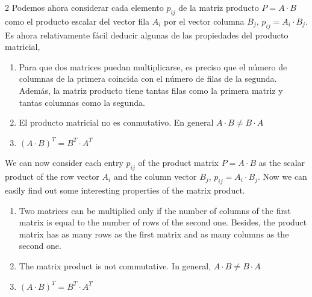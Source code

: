 \begin{paracol}{2}
Podemos ahora considerar  cada elemento $p_{ij}$ de la matriz producto $P=A\cdot B$ como el producto escalar del vector fila $A_i$ por el vector columna $B_j$, $p_{ij}=A_i\cdot B_j$. 
Es ahora relativamente fácil deducir algunas de las propiedades del producto matricial,

\begin{enumerate}
\item Para que dos matrices puedan multiplicarse, es preciso que el número de columnas de la primera coincida con el número de filas de la segunda. Además, la matriz producto tiene tantas filas como la primera matriz y tantas columnas como la segunda.

\item El producto matricial no es conmutativo. En general $A\cdot B \neq B \cdot A$

\item $(A\cdot B)^T=B^T\cdot A^T$
\end{enumerate}

\switchcolumn
We can now consider each entry $p_{ij}$ of the product matrix $P=A\cdot B$ as the scalar product of the row vector $A_i$ and the column vector $B_j$, $p_{ij} = A_i\cdot B_j$. Now we can easily find out some interesting properties of the matrix product.

\begin{enumerate}
\item Two matrices can be multiplied only if the number of columns of the first matrix is equal to the number of rows of the second one. Besides, the product matrix has as many rows as the first matrix and as many columns as the second one.

\item The matrix product is not commutative. In general, $A\cdot B \neq B \cdot A$

\item $(A\cdot B)^T=B^T\cdot A^T$
\end{enumerate}

\end{paracol}

